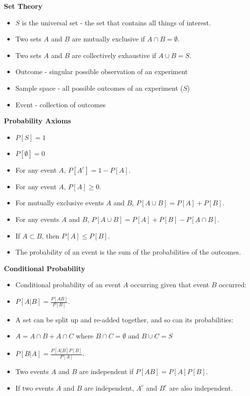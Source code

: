 \documentclass{article}
\begin{document}
\textbf{Set Theory}
\begin{itemize}
    \item $S$ is the universal set - the set that contains all things of interest.
    \item Two sets $A$ and $B$ are mutually exclusive if $A \cap B = \emptyset$.
    \item Two sets $A$ and $B$ are collectively exhaustive if $A \cup B = S$.
    \item Outcome - singular possible observation of an experiment
    \item Sample space - all possible outcomes of an experiment ($S$)
    \item Event - collection of outcomes
\end{itemize}
\textbf{Probability Axioms}
\begin{itemize}
    \item $P[S] = 1$
    \item $P[\emptyset] = 0$
    \item For any event $A$, $P[A^c] = 1 - P[A]$.
    \item For any event $A$, $P[A] \geq 0$.
    \item For mutually exclusive events $A$ and $B$, $P[A \cup B] = P[A] + P[B]$.
    \item For any events $A$ and $B$, $P[A \cup B] = P[A] + P[B] - P[A \cap B]$.
    \item If $A \subset B$, then $P[A] \leq P[B]$.
    \item The probability of an event is the sum of the probabilities of the outcomes.
\end{itemize}
\textbf{Conditional Probability}
\begin{itemize}
    \item Conditional probability of an event $A$ occurring given that event $B$ occurred:
    \item $P[A | B] = \frac{P[AB]}{P[B]}$.
    \item A set can be split up and re-added together, and so can its probabilities:
    \item $A = A \cap B + A \cap C$ where $B \cap C = \emptyset$ and $B \cup C = S$
    \item $P[B | A] = \frac{P[A|B]P[B]}{P[A]}$.
    \item Two events $A$ and $B$ are independent if $P[AB] = P[A]P[B]$.
    \item If two events $A$ and $B$ are independent, $A^c$ and $B^c$ are also independent.
\end{itemize}
\end{document}
